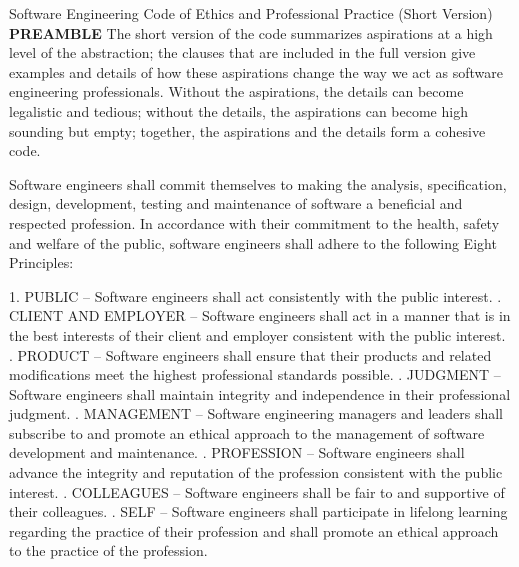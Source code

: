 \begin{definitionblock}{Software Engineering Code of Ethics and Professional Practice (Short Version)}  
	\textbf{PREAMBLE}
	The short version of the code summarizes aspirations at a high level of the abstraction; the clauses that are included in the full version give examples and details of how these aspirations change the way we act as software engineering professionals. Without the aspirations, the details can become legalistic and tedious; without the details, the aspirations can become high sounding but empty; together, the aspirations and the details form a cohesive code. \newline

	Software engineers shall commit themselves to making the analysis, specification, design, development, testing and maintenance of software a beneficial and respected profession. In accordance with their commitment to the health, safety and welfare of the public, software engineers shall adhere to the following Eight Principles: 
	
	1. PUBLIC – Software engineers shall act consistently with the public interest. . CLIENT AND EMPLOYER – Software engineers shall act in a manner that is in the best interests of their client and employer consistent with the public interest. . PRODUCT – Software engineers shall ensure that their products and related modifications meet the highest professional standards possible. . JUDGMENT – Software engineers shall maintain integrity and independence in their professional judgment. . MANAGEMENT – Software engineering managers and leaders shall subscribe to and promote an ethical approach to the management of software development and maintenance. . PROFESSION – Software engineers shall advance the integrity and reputation of the profession consistent with the public interest. . COLLEAGUES – Software engineers shall be fair to and supportive of their colleagues. . SELF – Software engineers shall participate in lifelong learning regarding the practice of their profession and shall promote an ethical approach to the practice of the profession.
\end{definitionblock}


